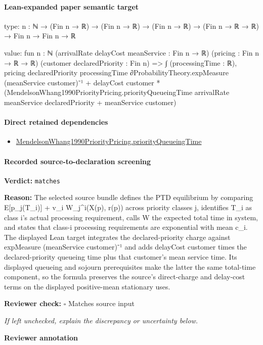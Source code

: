 \documentclass[10pt]{article}
\newcommand{\reviewerbox}{%
  \par\noindent\fbox{\parbox{0.96\linewidth}{\rule{0pt}{0.38in}}}\par
}
\newcommand{\reviewmatch}[1]{%
  \par\noindent\textbf{Reviewer check:} $\square$\; #1\par
  \noindent\emph{If left unchecked, explain the discrepancy or uncertainty below.}\par
}
\begin{document}
\paragraph{Lean-expanded paper semantic target}
\begin{ReviewVerbatim}
type:
{n : ℕ} → (Fin n → ℝ) → (Fin n → ℝ) → (Fin n → ℝ) → (Fin n → ℝ → ℝ) → Fin n → Fin n → ℝ

value:
fun {n : ℕ} (arrivalRate delayCost meanService : Fin n → ℝ) (pricing : Fin n → ℝ → ℝ)
    (customer declaredPriority : Fin n) =>
  ∫ (processingTime : ℝ),
      pricing declaredPriority processingTime ∂ProbabilityTheory.expMeasure (meanService customer)⁻¹ +
    delayCost customer *
      (MendelsonWhang1990PriorityPricing.priorityQueueingTime arrivalRate meanService declaredPriority +
        meanService customer)
\end{ReviewVerbatim}

\paragraph{Direct retained dependencies}
\begin{itemize}\raggedright
\item \hyperlink{paper-prerequisite-49957d909aa24bc5}{Mendelson\allowbreak{}Whang1990\allowbreak{}Priority\allowbreak{}Pricing.\allowbreak{}priority\allowbreak{}Queueing\allowbreak{}Time}
\end{itemize}
\paragraph{Recorded source-to-declaration screening}
\textbf{Verdict:} \texttt{matches}
\\
{\raggedright
\textbf{Reason:} The selected source bundle defines the PTD equilibrium by comparing E[p\_\allowbreak{}j(T\_\allowbreak{}i)] + v\_\allowbreak{}i W\_\allowbreak{}j\textasciicircum{}i(X(p), r(p)) across priority classes j, identifies T\_\allowbreak{}i as class i's actual processing requirement, calls W the expected total time in system, and states that class-\allowbreak{}i processing requirements are exponential with mean c\_\allowbreak{}i.\allowbreak{} The displayed Lean target integrates the declared-\allowbreak{}priority charge against expMeasure (meanService customer)⁻¹ and adds delayCost customer times the declared-\allowbreak{}priority queueing time plus that customer's mean service time.\allowbreak{} Its displayed queueing and sojourn prerequisites make the latter the same total-\allowbreak{}time component, so the formula preserves the source's direct-\allowbreak{}charge and delay-\allowbreak{}cost terms on the displayed positive-\allowbreak{}mean stationary uses.\allowbreak{}
\par}
\reviewmatch{Matches source input}
\noindent\textbf{Reviewer annotation}\par
\reviewerbox
\clearpage
\hypertarget{paper-prerequisite-84dca75fd93aa845}{}
\end{document}
